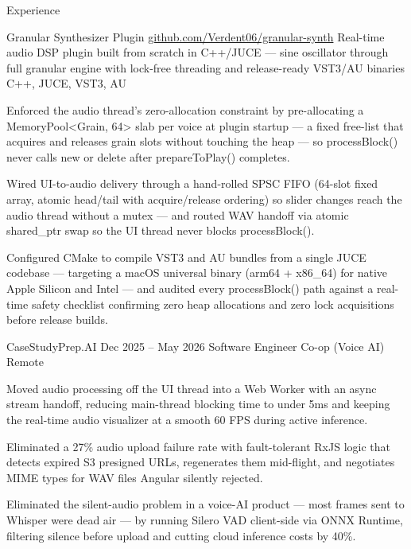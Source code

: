 \documentclass[
	11pt
]{../../../template}
\begin{document}
	\begin{rSection}{E}{xperience}
		\begin{rSectionEntry}
			{Granular Synthesizer Plugin}
			{\href{https://github.com/Verdent06/granular-synth}{github.com/Verdent06/granular-synth}}
			{Real-time audio DSP plugin built from scratch in C++/JUCE --- sine oscillator through full granular engine with lock-free threading and release-ready VST3/AU binaries}
			{C++, JUCE, VST3, AU}
			{}

			\item Enforced the audio thread's zero-allocation constraint by pre-allocating a MemoryPool\textless{}Grain, 64\textgreater{} slab per voice at plugin startup --- a fixed free-list that acquires and releases grain slots without touching the heap --- so processBlock() never calls new or delete after prepareToPlay() completes.
			\item Wired UI-to-audio delivery through a hand-rolled SPSC FIFO (64-slot fixed array, atomic head/tail with acquire/release ordering) so slider changes reach the audio thread without a mutex --- and routed WAV handoff via atomic shared\_ptr swap so the UI thread never blocks processBlock().
			\item Configured CMake to compile VST3 and AU bundles from a single JUCE codebase --- targeting a macOS universal binary (arm64 + x86\_64) for native Apple Silicon and Intel --- and audited every processBlock() path against a real-time safety checklist confirming zero heap allocations and zero lock acquisitions before release builds.
		\end{rSectionEntry}

		\begin{rSectionEntry}
			{CaseStudyPrep.AI}
			{Dec 2025 -- May 2026}
			{Software Engineer Co-op (Voice AI)}
			{}
			{Remote}

			\item Moved audio processing off the UI thread into a Web Worker with an async stream handoff, reducing main-thread blocking time to under 5ms and keeping the real-time audio visualizer at a smooth 60 FPS during active inference.
			\item Eliminated a 27\% audio upload failure rate with fault-tolerant RxJS logic that detects expired S3 presigned URLs, regenerates them mid-flight, and negotiates MIME types for WAV files Angular silently rejected.
			\item Eliminated the silent-audio problem in a voice-AI product --- most frames sent to Whisper were dead air --- by running Silero VAD client-side via ONNX Runtime, filtering silence before upload and cutting cloud inference costs by 40\%.
		\end{rSectionEntry}


\end{rSection}
\end{document}
